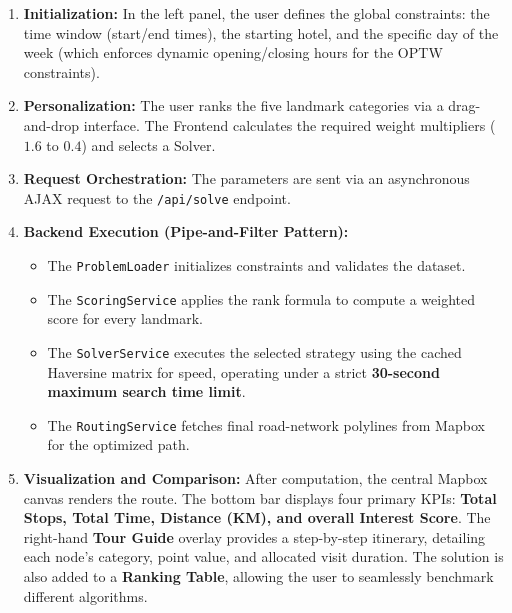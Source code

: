 \begin{enumerate}
    \item \textbf{Initialization:} In the left panel, the user defines the global constraints: the time window (start/end times), the starting hotel, and the specific day of the week (which enforces dynamic opening/closing hours for the OPTW constraints).
    \item \textbf{Personalization:} The user ranks the five landmark categories via a drag-and-drop interface. The Frontend calculates the required weight multipliers ($1.6$ to $0.4$) and selects a Solver.
    \item \textbf{Request Orchestration:} The parameters are sent via an asynchronous AJAX request to the \texttt{/api/solve} endpoint.
    \item \textbf{Backend Execution (Pipe-and-Filter Pattern):}
    \begin{itemize}
        \item The \texttt{ProblemLoader} initializes constraints and validates the dataset.
        \item The \texttt{ScoringService} applies the rank formula to compute a weighted score for every landmark.
        \item The \texttt{SolverService} executes the selected strategy using the cached Haversine matrix for speed, operating under a strict \textbf{30-second maximum search time limit}.
        \item The \texttt{RoutingService} fetches final road-network polylines from Mapbox for the optimized path.
    \end{itemize}
    \item \textbf{Visualization and Comparison:} After computation, the central Mapbox canvas renders the route. The bottom bar displays four primary KPIs: \textbf{Total Stops, Total Time, Distance (KM), and overall Interest Score}. The right-hand \textbf{Tour Guide} overlay provides a step-by-step itinerary, detailing each node's category, point value, and allocated visit duration. The solution is also added to a \textbf{Ranking Table}, allowing the user to seamlessly benchmark different algorithms.
\end{enumerate}


